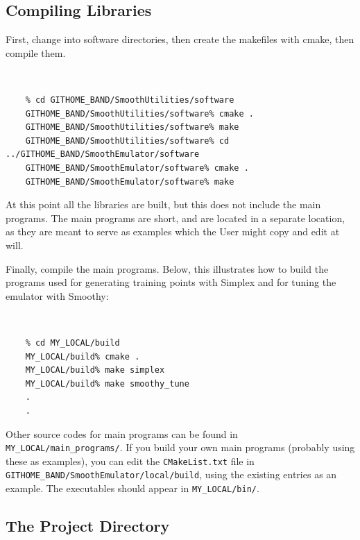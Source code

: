 \documentclass[UserManual.tex]{subfiles}
\begin{document}
\subsection{Compiling Libraries }

First, change into software directories, then create the makefiles with cmake, then compile them.
{\tt 
\begin{verbatim}
    % cd GITHOME_BAND/SmoothUtilities/software
    GITHOME_BAND/SmoothUtilities/software% cmake .
    GITHOME_BAND/SmoothUtilities/software% make
    GITHOME_BAND/SmoothUtilities/software% cd ../GITHOME_BAND/SmoothEmulator/software
    GITHOME_BAND/SmoothEmulator/software% cmake .
    GITHOME_BAND/SmoothEmulator/software% make
\end{verbatim}
}
At this point all the libraries are built, but this does not include the main programs. The main programs are short, and are located in a separate location, as they are meant to serve as examples which the User might copy and edit at will.

Finally, compile the main programs. Below, this illustrates how to build the programs used for generating training points with Simplex and for tuning the emulator with Smoothy:
{\tt
\begin{verbatim}
    % cd MY_LOCAL/build
    MY_LOCAL/build% cmake .
    MY_LOCAL/build% make simplex
    MY_LOCAL/build% make smoothy_tune
    .
    .
\end{verbatim}
}
Other source codes for main programs can be found in {\tt MY\_LOCAL/main\_programs/}. If you build your own main programs (probably using these as examples), you can edit the {\tt CMakeList.txt} file in {\tt GITHOME\_BAND/SmoothEmulator/local/build}, using the existing entries as an example. The executables should appear in {\tt MY\_LOCAL/bin/}. 

\subsection{The Project Directory}
\end{document}
